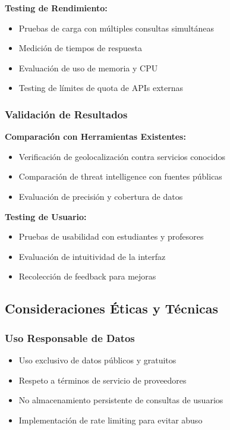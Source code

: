 \textbf{Testing de Rendimiento:}
\begin{itemize}
    \item Pruebas de carga con múltiples consultas simultáneas
    \item Medición de tiempos de respuesta
    \item Evaluación de uso de memoria y CPU
    \item Testing de límites de quota de APIs externas
\end{itemize}

\subsubsection{Validación de Resultados}

\textbf{Comparación con Herramientas Existentes:}
\begin{itemize}
    \item Verificación de geolocalización contra servicios conocidos
    \item Comparación de threat intelligence con fuentes públicas
    \item Evaluación de precisión y cobertura de datos
\end{itemize}

\textbf{Testing de Usuario:}
\begin{itemize}
    \item Pruebas de usabilidad con estudiantes y profesores
    \item Evaluación de intuitividad de la interfaz
    \item Recolección de feedback para mejoras
\end{itemize}

\subsection{Consideraciones Éticas y Técnicas}

\subsubsection{Uso Responsable de Datos}
\begin{itemize}
    \item Uso exclusivo de datos públicos y gratuitos
    \item Respeto a términos de servicio de proveedores
    \item No almacenamiento persistente de consultas de usuarios
    \item Implementación de rate limiting para evitar abuso
\end{itemize}

